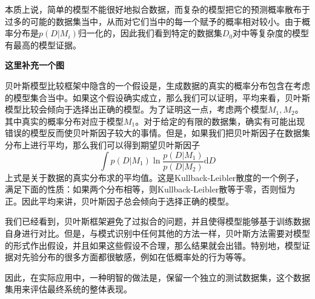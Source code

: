 本质上说，简单的模型不能很好地拟合数据，而复杂的模型把它的预测概率散布于过多的可能的数据集当中，从而对它们当中的每一个赋予的概率相对较小。由于概率分布是$p(D|M_i)$归一化的，因此我们看到特定的数据集$D_0$对中等复杂度的模型有最高的模型证据。

\textbf{这里补充一个图}

贝叶斯模型比较框架中隐含的一个假设是，生成数据的真实的概率分布包含在考虑的模型集合当中。如果这个假设确实成立，那么我们可以证明，平均来看，贝叶斯模型比较会倾向于选择出正确的模型。为了证明这一点，考虑两个模型$M_1,M_2$。其中真实的概率分布对应于模型$M_1$。对于给定的有限的数据集，确实有可能出现错误的模型反而使贝叶斯因子较大的事情。但是，如果我们把贝叶斯因子在数据集分布上进行平均，那么我们可以得到期望贝叶斯因子 
\begin{equation}
	\int p(D|M_1)\ln \frac{p(D|M_1)}{p(D|M_2)}\mathrm{d}D
\end{equation}
上式是关于数据的真实分布求的平均值。这是Kullback-Leibler散度的一个例子，满足下面的性质：如果两个分布相等，则Kullback-Leibler散等于零，否则恒为正。因此平均来讲，贝叶斯因子总会倾向于选择正确的模型。

我们已经看到，贝叶斯框架避免了过拟合的问题，并且使得模型能够基于训练数据自身进行对比。但是，与模式识别中任何其他的方法一样，贝叶斯方法需要对模型的形式作出假设，并且如果这些假设不合理，那么结果就会出错。特别地，模型证据对先验分布的很多方面都很敏感，例如在低概率处的行为等等。

因此，在实际应用中，一种明智的做法是，保留一个独立的测试数据集，这个数据集用来评估最终系统的整体表现。